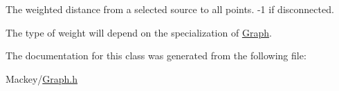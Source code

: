The weighted distance from a selected source to all points. -\/1 if disconnected. 

The type of weight will depend on the specialization of \hyperlink{classMackey_1_1Graph}{Graph}. 

The documentation for this class was generated from the following file\+:\begin{DoxyCompactItemize}
\item 
Mackey/\hyperlink{Graph_8h}{Graph.\+h}\end{DoxyCompactItemize}
